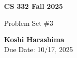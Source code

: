 \documentclass[11pt]{article}
\begin{document}
\begin{titlepage}
   \begin{center}
       \vspace*{9cm}

       \textbf{CS 332 Fall 2025}

       \vspace{0.5cm}
        Problem Set \#3
        \vfill

       \textbf{Koshi Harashima}\\
       Due Date: 10/17, 2025
            
   \end{center}
\end{titlepage}

\pagebreak

\end{document}

